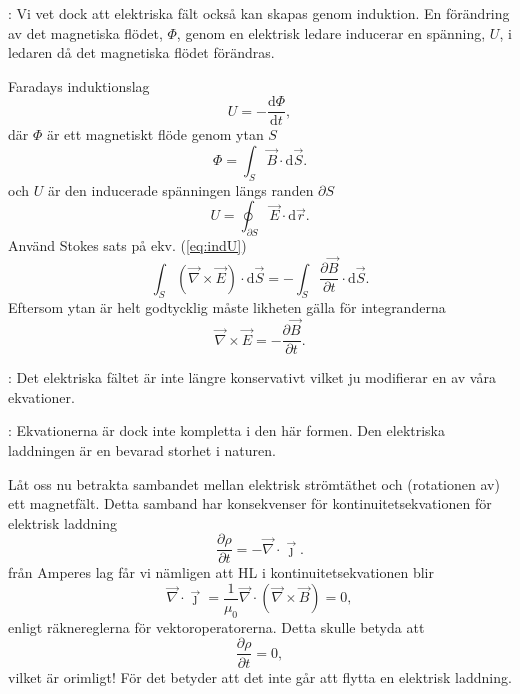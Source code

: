 \documentclass[%
oneside,                 %
final,                   %
10pt]{article}
\newcommand{\shortinlinecomment}[3]{{\color{red}{\bf #1}: #2}}
\newcommand{\longinlinecomment}[3]{{\color{red}{\bf #1}: #2}}
\begin{document}
\longinlinecomment{Comment 4}{ Vi vet dock att elektriska fält också kan skapas genom induktion.  En förändring av det magnetiska flödet, $\Phi$, genom en elektrisk ledare inducerar en spänning, $U$, i ledaren då det magnetiska flödet förändras. }{ Vi vet dock att }  

Faradays induktionslag
\begin{equation}
  U = - \frac{\mbox{d}\Phi}{\mbox{d}t},
\end{equation}
där $\Phi$ är ett magnetiskt flöde genom ytan $S$
\begin{equation}
  \Phi = \int_S \vec{B} \cdot \mbox{d} \vec{S}.
\end{equation}
och $U$ är den inducerade spänningen längs randen $\partial S$
\begin{equation}
  U = \oint_{\partial S} \vec{E} \cdot \mbox{d}\vec{r}.
  \label{eq:indU}
\end{equation}
Använd Stokes sats på ekv. (\ref{eq:indU})
$$
  \int_S \left( \vec{\nabla} \times \vec{E}\right) \cdot \mbox{d}\vec{S} = -
\int_S \frac{\partial \vec{B}}{\partial t} \cdot \mbox{d}\vec{S}.
$$
Eftersom ytan är helt godtycklig måste likheten gälla för integranderna
\begin{equation}
  \vec{\nabla} \times \vec{E} = - \frac{\partial \vec{B}}{\partial t}.
\end{equation}

\shortinlinecomment{Comment 5}{ Det elektriska fältet är inte längre konservativt vilket ju modifierar en av våra ekvationer. }{ Det elektriska fältet är }

\longinlinecomment{Comment 6}{ Ekvationerna är dock inte kompletta i den här formen.  Den elektriska laddningen är en bevarad storhet i naturen. }{ Ekvationerna är dock inte }

Låt oss nu betrakta sambandet mellan elektrisk strömtäthet och (rotationen av) ett magnetfält. Detta samband har konsekvenser för kontinuitetsekvationen för elektrisk laddning
$$
  \frac{\partial \rho}{\partial t} = - \vec{\nabla} \cdot \vec{\jmath}.
$$
från Amperes lag får vi nämligen att HL i kontinuitetsekvationen blir
$$
  \vec{\nabla} \cdot \vec{\jmath} = \frac{1}{\mu_0} \vec{\nabla} \cdot \left(\vec{\nabla} \times
\vec{B}\right) = 0,
$$
enligt räknereglerna för vektoroperatorerna. Detta skulle betyda att
$$
  \frac{\partial \rho}{\partial t} = 0,
$$
vilket är orimligt! 
För det betyder att det inte går att flytta en elektrisk laddning.  
\end{document}
